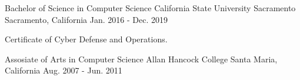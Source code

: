 

\begin{cventries}

  \cventry
    {Bachelor of Science in Computer Science} %
    {California State University Sacramento} %
    {Sacramento, California} %
	  {Jan. 2016 - Dec. 2019} %
    {
      \begin{cvitems} %
        \item {Certificate of Cyber Defense and Operations.}
      \end{cvitems}
    }

  \cventry
    {Assosiate of Arts in Computer Science} %
    {Allan Hancock College} %
    {Santa Maria, California} %
    {Aug. 2007 - Jun. 2011} %
    {
      \begin{cvitems} %
      \end{cvitems}
    }

\end{cventries}